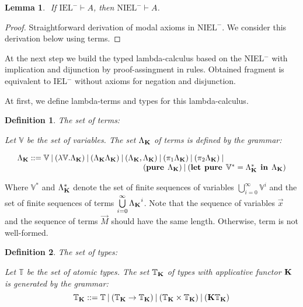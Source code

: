 \documentclass[a4paper]{article}
\newtheorem{lemma}{Lemma}
\newtheorem{defin}{Definition}
\begin{document}
\begin{lemma}
  $ $
  If $\text{IEL}^{-} \vdash A$, then $\text{NIEL}^{-} \vdash A$.
\end{lemma}

\begin{proof}
  Straightforward derivation of modal axioms in $\text{NIEL}^{-}$. We consider this derivation below using terms.
\end{proof}

  \vspace{\baselineskip}

  At the next step we build the typed lambda-calculus based on the NIEL$^{-}$ with implication and dijunction
by proof-assingment in rules. Obtained fragment is equivalent to IEL$^{-}$ without axioms for negation and disjunction.

  At first, we define lambda-terms and types for this lambda-calculus.

  \vspace{\baselineskip}

  \begin{defin} The set of terms:

  Let $\mathbb{V}$ be the set of variables. The set $\Lambda_{{\bf K}}$ of terms is defined by the grammar:

$\begin{array}{lll}
& \Lambda_{{\bf K}} ::= \mathbb{V} \: | \:  (\lambda \mathbb{V}.\Lambda_{{\bf K}}) \: | \: (\Lambda_{{\bf K}}\Lambda_{{\bf K}}) \: | \: (\Lambda_{{\bf K}} , \Lambda_{{\bf K}}) \: | \: (\pi_1 \Lambda_{{\bf K}}) \: | \: (\pi_2 \Lambda_{{\bf K}}) \: | & \\
& \quad\quad\quad\quad\quad\quad\quad\quad\quad\quad\quad\quad\quad\quad\quad\quad ({\bf pure \: } \: \Lambda_{{\bf K}}) \: | \: ({\bf let \:\: pure} \:\: \mathbb{V}^{*} = \Lambda_{{\bf K}}^{*} \:\: {\bf in} \:\: \Lambda_{{\bf K}})
\end{array}$

  \end{defin}

Where $\mathbb{V}^{*}$ and $\Lambda_{{\bf K}}^{*}$ denote the set of finite sequences of variables $\bigcup \limits_{i=0}^{\infty} \mathbb{V}^i$
and the set of finite sequences of terms $\bigcup \limits_{i = 0}^{\infty} {\Lambda_{{\bf K}}}^i $. Note that the sequence of variables $\vec{x}$ and the sequence of terms $\vec{M}$ should have the same length.
Otherwise, term is not well-formed.

  \begin{defin} The set of types:

  Let $\mathbb{T}$ be the set of atomic types. The set $\mathbb{T}_{{\bf K}}$ of types with applicative
  functor ${\bf K}$ is generated by the grammar:
  \begin{equation}
    \mathbb{T}_{{\bf K}} ::= \mathbb{T} \: | \: (\mathbb{T}_{{\bf K}} \to \mathbb{T}_{{\bf K}}) \: |
    \: (\mathbb{T}_{{\bf K}} \times \mathbb{T}_{{\bf K}}) \: | \: ({\bf K}\mathbb{T}_{{\bf K}})
  \end{equation}
  \end{defin}
\end{document}
